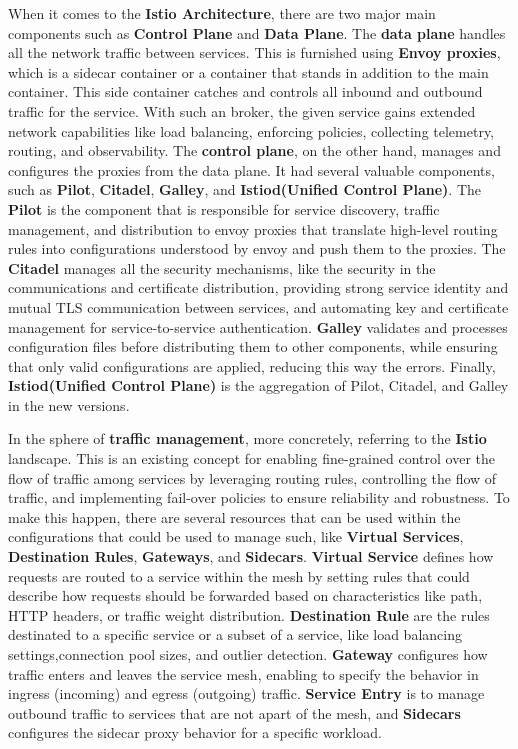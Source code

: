 When it comes to the \textbf{Istio Architecture}, there are two major main components such as \textbf{Control Plane} and \textbf{Data Plane}. The \textbf{data plane} handles all the network traffic between services. This is furnished using \textbf{Envoy proxies}, which is a sidecar container or a container that stands in addition to the main container. This side container catches and controls all inbound and outbound traffic for the service. With such an broker, the given service gains extended network capabilities like load balancing, enforcing policies, collecting telemetry, routing, and observability. The \textbf{control plane}, on the other hand, manages and configures the proxies from the data plane. It had several valuable components, such as \textbf{Pilot}, \textbf{Citadel}, \textbf{Galley}, and \textbf{Istiod(Unified Control Plane)}. The \textbf{Pilot} is the component that is responsible for service discovery, traffic management, and distribution to envoy proxies that translate high-level routing rules into configurations understood by envoy and push them to the proxies. The \textbf{Citadel} manages all the security mechanisms, like the security in the communications and certificate distribution, providing strong service identity and mutual TLS communication between services, and automating key and certificate management for service-to-service authentication. \textbf{Galley} validates and processes configuration files before distributing them to other components, while ensuring that only valid configurations are applied, reducing this way the errors. Finally, \textbf{Istiod(Unified Control Plane)} is the aggregation of Pilot, Citadel, and Galley in the new versions.

In the sphere of \textbf{traffic management}, more concretely, referring to the \textbf{Istio} landscape. This is an existing concept for enabling fine-grained control over the flow of traffic among services by leveraging routing rules, controlling the flow of traffic, and implementing fail-over policies to ensure reliability and robustness. To make this happen, there are several resources that can be used within the configurations that could be used to manage such, like \textbf{Virtual Services}, \textbf{Destination Rules}, \textbf{Gateways}, and \textbf{Sidecars}. \textbf{Virtual Service} defines how requests are routed to a service within the mesh by setting rules that could describe how requests should be forwarded based on characteristics like path, HTTP headers, or traffic weight distribution. \textbf{Destination Rule} are the rules destinated to a specific service or a subset of a service, like load balancing settings,connection pool sizes, and outlier detection. \textbf{Gateway} configures how traffic enters and leaves the service mesh, enabling to specify the behavior in ingress (incoming) and egress (outgoing) traffic. \textbf{Service Entry} is to manage outbound traffic to services that are not apart of the mesh, and \textbf{Sidecars} configures the sidecar proxy behavior for a specific workload.

